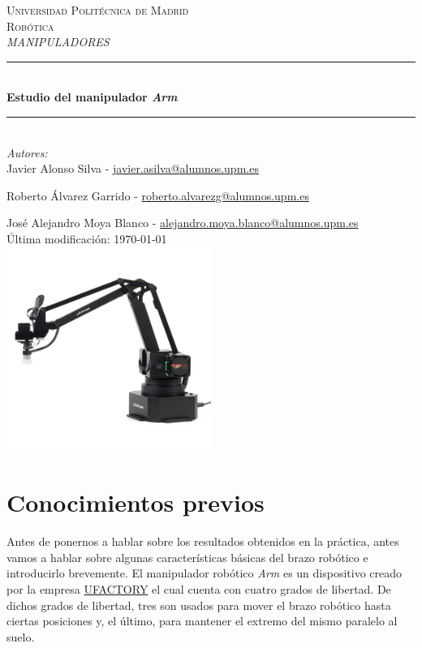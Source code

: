 \documentclass[a4paper,12pt]{article}
\begin{document}
\begin{titlepage}

    \newcommand{\HRule}{\rule{\linewidth}{0.5mm}}
    \center

    \textsc{\LARGE Universidad Politécnica de Madrid}\\[1cm]

    \textsc{\Large Robótica}\\[0.2cm]
    \textsc{\large \textit{MANIPULADORES}}\\[1cm]
    \HRule \\[0.8cm]
    { \huge \bfseries Estudio del manipulador \textit{{\textmu}Arm}}\\[0.7cm]
    \HRule \\[2cm]
    \large
    \emph{Autores:}\\
    Javier Alonso Silva - \href{mailto:javier.asilva@alumnos.upm.es}{javier.asilva@alumnos.upm.es}

    Roberto Álvarez Garrido - \href{mailto:roberto.alvarezg@alumnos.upm.es}{roberto.alvarezg@alumnos.upm.es}

    José Alejandro Moya Blanco - \href{mailto:alejandro.moya.blanco@alumnos.upm.es}{alejandro.moya.blanco@alumnos.upm.es}\\[1.5cm]
    {\large Última modificación: \today}\\[2cm]
    \includegraphics[width=0.5\textwidth]{images/uarm.jpg}\\[1cm]
\end{titlepage}

\section*{Conocimientos previos}

Antes de ponernos a hablar sobre los resultados obtenidos en la práctica,
antes vamos a hablar sobre algunas características básicas del brazo robótico e
introducirlo brevemente.
El manipulador robótico \emph{{\textmu}Arm} es un dispositivo creado por la empresa
\href{https://www.ufactory.cc/#/}{UFACTORY} el cual cuenta con cuatro grados de libertad.
De dichos grados de libertad, tres son usados para mover el brazo robótico hasta ciertas
posiciones y, el último, para mantener el extremo del mismo paralelo al suelo.
\end{document}
